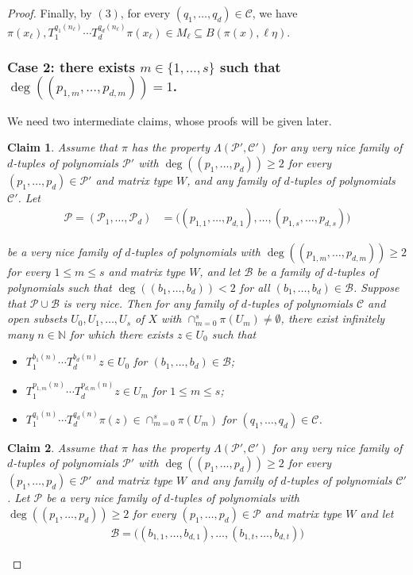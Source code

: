 \documentclass[11pt,reqno]{amsart}
\newcommand{\N}{\mathbb{N}}
\newcommand{\cB}{{\mathcal B}}
\newcommand{\cC}{{\mathcal C}}
\newcommand{\cP}{{\mathcal P}}
\newtheorem{claim}[claim]{Claim}
\theoremstyle{definition}
\theoremstyle{remark}
\begin{document}
\begin{proof}
Finally, by $(3)$, for every $(q_1,\dots,q_d)\in \cC$, we have $\pi(x_\ell),T_1^{q_1(n_\ell)}\cdots T_d^{q_d(n_\ell)}\pi(x_\ell)\in M_\ell \subseteq B(\pi(x),\ell\eta)$.

\subsubsection*{Case 2: there exists $m\in \{1,\dots,s\}$ such that $\deg((p_{1,m},\dots,p_{d,m}))=1$.}

We need two intermediate claims, whose proofs will be given later.

\begin{claim}\label{claim 1}
     Assume that $\pi$ has the property $\Lambda(\cP',\cC')$ for any very nice family of $d$-tuples of polynomials $\cP'$ with $\deg((p_1,\dots,p_d))\geq 2$ for every $(p_1,\dots,p_d)\in \cP'$ and matrix type $W$, and any family of $d$-tuples of polynomials $\cC'$. Let \begin{align*}
        \cP=(\cP_1,\dots,\cP_d) &= \big((p_{1,1},\dots,p_{d,1}),\dots,(p_{1,s},\dots,p_{d,s})\big)
    \end{align*}

     be a very nice family of $d$-tuples of polynomials with $\deg((p_{1,m},\dots,p_{d,m}))\geq 2$ for every $1\leq m\leq s$ and matrix type $W$, and let $\cB$ be a family of $d$-tuples of polynomials such that $\deg((b_1,\dots,b_d))<2$ for all $(b_1,\dots,b_d)\in\cB$. Suppose that $\cP\cup\cB$ is very nice. Then for any family of $d$-tuples of polynomials $\cC$ and open subsets $U_0,U_1,\dots,U_s$ of $X$ with $\cap_{m=0}^{s}\pi(U_m)\neq\emptyset$, there exist infinitely many $n\in \N$ for which there exists $z\in U_0$ such that\begin{itemize}
        \item $T_1^{b_1(n)}\cdots T_d^{b_d(n)}z\in U_0$ for $(b_1,\dots,b_d)\in \cB$;
        \item $T_1^{p_{1,m}(n)}\cdots T_d^{p_{d,m}(n)}z\in U_m$ for $1\leq m \leq s$;
        \item $T_1^{q_1(n)}\cdots T_d^{q_d(n)}\pi(z)\in \cap_{m=0}^{s}\pi(U_m)$ for $(q_1,\dots,q_d)\in \cC$.
    \end{itemize}
\end{claim}


\begin{claim}\label{claim 2}
    Assume that $\pi$ has the property $\Lambda(\cP',\cC')$ for any very nice family of $d$-tuples of polynomials $\cP'$ with $\deg((p_1,\dots,p_d))\geq 2$ for every $(p_1,\dots,p_d)\in \cP'$ and matrix type $W$ and any family of $d$-tuples of polynomials $\cC'$. Let $\cP$ be a very nice family of $d$-tuples of polynomials with $\deg((p_1,\dots,p_d))\geq 2$ for every $(p_1,\dots,p_d)\in \cP$ and matrix type $W$ and let \begin{align*}
        \cB= \big((b_{1,1},\dots,b_{d,1}),\dots,(b_{1,t},\dots,b_{d,t})\big)
    \end{align*}


\end{claim}
\end{proof}
\end{document}
